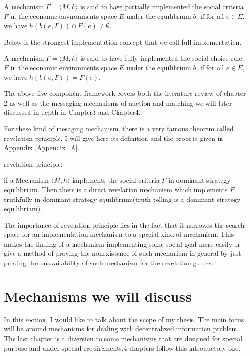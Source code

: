  \begin{definition}
A mechanism $\Gamma=\langle M,h\rangle$ is said to have partially implemented the social
criteria  $F$ in the economic environments space $E$ under the
equilibrium $b$, if for all $e \in E$, we have $h(b(e,\Gamma)) \cap
F(e) \not = \emptyset$.
\end{definition}


Below is the strongest implementation concept that we call full
implementation.

 \begin{definition}
A mechanism $\Gamma=\langle M,h\rangle$ is said to have fully implemented the social
choice rule  $F$ in the economic environments space $E$ under the
equilibrium $b$, if for all $e \in E$, we have $h(b(e,\Gamma)) = F(e)$.
\end{definition}



The above five-component framework covers both the literature review of chapter 2 as well as the messaging
mechanisms of auction and matching we will later discussed in-depth in
Chapter3 and Chapter4.

For these kind of mesaging mechanism, there is a very famous
theorem called revelation principle. I will give here its definition
and the proof is given in Appendix \ref{Appendix_A}.

\begin{thm*}
revelation principle:

if a Mechanism $\langle M, h\rangle$ implements the social criteria 
$F$ in dominant strategy
equilibrium. Then there is a direct revelation mechanism which
implements $F$ truthfully in dominant strategy equilibrium(truth
telling is a dominant strategy equilibrium). 

\end{thm*}

The importance of revelation principle lies in the fact that it narrowes the search space for an implementation mechanism to a special kind of mechanism. This makes the finding of a mechanism implementing some social goal more easily or give a method of proving the nonexistence of such mechanism in general by just proving the unavailability of such mechanism for the revelation games.

\section{Mechanisms we will discuss}

In this section, I would like to talk about the scope of my
thesis. The main focus will be around mechanisms for dealing with
decentralized information problem. The last chapter is a diversion to
some
mechanisms that are designed for special purpose and under special requirements.4 chapters follow this introductory one.

